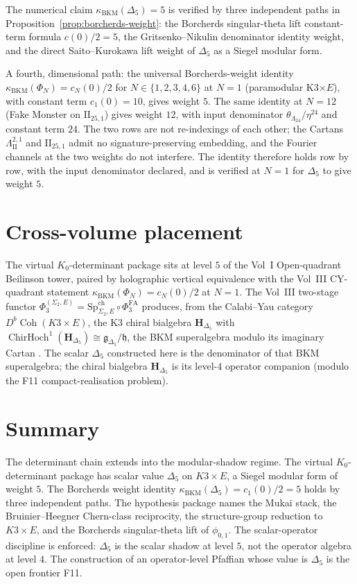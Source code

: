 \documentclass[11pt]{memoir}
\providecommand{\Coh}{\operatorname{Coh}}
\providecommand{\BKM}{\operatorname{BKM}}
\providecommand{\fg}{\mathfrak{g}}
\providecommand{\fh}{\mathfrak{h}}
\providecommand{\ChirHoch}{\operatorname{ChirHoch}}
\begin{document}
The numerical claim $\kappa_{\BKM}(\Delta_5) = 5$ is verified by three
independent paths in Proposition~\ref{prop:borcherds-weight}: the
Borcherds singular-theta lift constant-term formula $c(0)/2 = 5$, the
Gritsenko--Nikulin denominator identity weight, and the direct
Saito--Kurokawa lift weight of $\Delta_5$ as a Siegel modular form.

A fourth, dimensional path: the universal Borcherds-weight identity
$\kappa_{\BKM}(\Phi_N) = c_N(0)/2$ for $N \in \{1, 2, 3, 4, 6\}$ at
$N = 1$ (paramodular K3$\times E$), with constant term
$c_1(0) = 10$, gives weight $5$. The same identity at $N = 12$ (Fake
Monster on $\mathrm{II}_{25,1}$) gives weight $12$, with input
denominator $\theta_{\Lambda_{24}}/\eta^{24}$ and constant term $24$.
The two rows are not re-indexings of each other; the Cartans
$\Lambda^{2,1}_{\mathrm{II}}$ and $\mathrm{II}_{25,1}$ admit no
signature-preserving embedding, and the Fourier channels at the two
weights do not interfere. The identity therefore holds row by row,
with the input denominator declared, and is verified at $N = 1$ for
$\Delta_5$ to give weight $5$.

\section{Cross-volume placement}
\label{sec:vd-cross-volume}

The virtual $K_0$-determinant package sits at level $5$ of the Vol~I
Open-quadrant Beilinson tower, paired by holographic vertical
equivalence with the Vol~III CY-quadrant statement
$\kappa_{\BKM}(\Phi_N) = c_N(0)/2$ at $N=1$. The Vol~III
two-stage functor
$\Phi_3^{(\Sigma_2, E)} = \mathrm{Sp}^{\mathrm{ch}}_{\Sigma_2, E}
\circ \Phi_3^{\mathrm{FA}}$ produces, from the Calabi--Yau category
$D^b\Coh(K3 \times E)$, the K3 chiral bialgebra $\mathbf H_{\Delta_5}$
with $\ChirHoch^1(\mathbf H_{\Delta_5}) \cong \fg_{\Delta_5}/\fh$,
the BKM superalgebra modulo its imaginary Cartan
\cite{LorgatVol3}. The scalar $\Delta_5$ constructed here is the
denominator of that BKM superalgebra; the chiral bialgebra
$\mathbf H_{\Delta_5}$ is its level-$4$ operator companion (modulo the
F11 compact-realisation problem).

\section{Summary}
\label{sec:vd-summary}

The determinant chain extends into the modular-shadow
regime. The virtual $K_0$-determinant package has
scalar value $\Delta_5$ on $K3 \times E$, a
Siegel modular form of weight $5$. The Borcherds weight identity
$\kappa_{\BKM}(\Delta_5) = c_1(0)/2 = 5$ holds by three independent
paths. The hypothesis package names the Mukai stack, the Bruinier--Heegner
Chern-class reciprocity, the structure-group reduction to $K3 \times
E$, and the Borcherds singular-theta lift of $\phi_{0,1}$. The scalar-operator
discipline is enforced: $\Delta_5$ is the scalar shadow at level $5$,
not the operator algebra at level $4$. The construction of an
operator-level Pfaffian whose value is $\Delta_5$ is the open
frontier F11.
\end{document}
